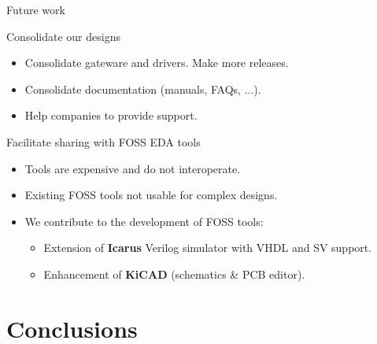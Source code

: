 \documentclass[compress,red]{beamer}
\begin{document}
\begin{frame}{Future work}

  \begin{block}{Consolidate our designs}
    \begin{itemize}
    \item Consolidate gateware and drivers. Make more releases.
    \item Consolidate documentation (manuals, FAQs, ...).
    \item Help companies to provide support.
    \end{itemize}
  \end{block}

  \begin{block}{Facilitate sharing with FOSS EDA tools}
    \begin{itemize}
    \item Tools are expensive and do not interoperate.
    \item Existing FOSS tools not usable for complex designs.
    \item We contribute to the development of FOSS tools:
      \begin{itemize}
      \item Extension of \textbf{Icarus} Verilog simulator with VHDL and SV support. %
      \item Enhancement of \textbf{KiCAD} (schematics \& PCB editor).
      \end{itemize}
    \end{itemize}
  \end{block}

  \note[item]{}

\end{frame}



\section{Conclusions}

\subsection*{} %
\end{document}
